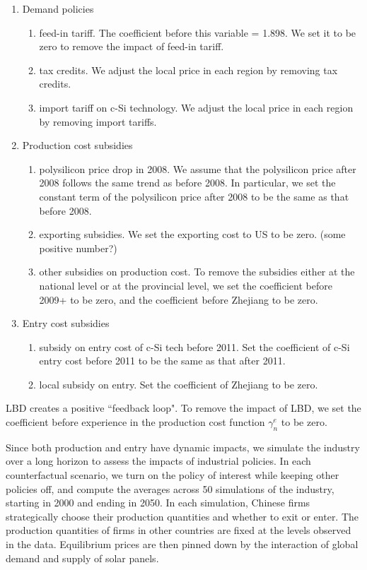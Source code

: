\documentclass[12pt, letter]{article}
\begin{document}
\begin{enumerate}
    \item Demand policies
        \begin{enumerate}
            \item feed-in tariff. The coefficient before this variable = 1.898. We set it to be zero to remove the impact of feed-in tariff.
            \item tax credits. We adjust the local price in each region by removing tax credits. 
            \item import tariff on c-Si technology. We adjust the local price in each region by removing import tariffs.
        \end{enumerate}
    \item Production cost subsidies
        \begin{enumerate}
            \item polysilicon price drop in 2008.  We assume that the polysilicon price after 2008 follows the same trend as before 2008. In particular, we set the constant term of the polysilicon price after 2008 to be the same as that before 2008.
            \item exporting subsidies. We set the exporting cost to US to be zero. (some positive number?)
            \item other subsidies on production cost. To remove the subsidies either at the national level or at the provincial level, we set the coefficient before 2009+ to be zero, and the coefficient before Zhejiang to be zero.
        \end{enumerate}
     \item Entry cost subsidies
        \begin{enumerate}
            \item subsidy on entry cost of c-Si tech before 2011. Set the coefficient of c-Si entry cost before 2011 to be the same as that after 2011.
            \item local subsidy on entry. Set the coefficient of Zhejiang to be zero.
        \end{enumerate}
\end{enumerate}

LBD creates a positive ``feedback loop".
To remove the impact of LBD, we set the coefficient before experience in the production cost function $\gamma_n^e$ to be zero.

Since both production and entry have dynamic impacts, we simulate the industry over a long horizon to assess the impacts of industrial policies. In each counterfactual scenario, we turn on the policy of interest while keeping other policies off, and compute the averages across 50 simulations of the industry, starting in 2000 and ending in 2050. In each simulation, Chinese firms strategically choose their production quantities and whether to exit or enter. The production quantities of firms in other countries are fixed at the levels observed in the data. Equilibrium prices are then pinned down by the interaction of global demand and supply of solar panels. 
\end{document}
